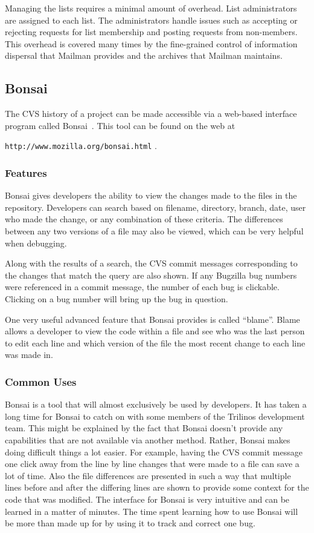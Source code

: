 \documentclass[12pt,relax]{article}
\newcommand{\InlineDirectory}[1]{
  {\hspace{0.01 in}} {\tt #1} {\hspace{0.01 in}}}
\begin{document}
Managing the lists requires a minimal amount of overhead.  List administrators
are assigned to each list.  The administrators handle issues such as accepting
or rejecting requests for list membership and posting requests from 
non-members.  This overhead is covered many times by the fine-grained control
of information dispersal that Mailman provides and the archives that 
Mailman maintains.

\subsection{Bonsai}
\label{subsect:Bonsai}

The CVS history of a project can be made accessible via a
web-based interface program called Bonsai~\cite{Bonsai}.  This tool can be 
found on the web at 
\newline
\InlineDirectory{http://www.mozilla.org/bonsai.html}.  

\subsubsection{Features}

Bonsai gives developers the ability to view the changes made to the files in 
the repository. Developers can search 
based on filename, directory, branch, date, user who made the 
change, or any combination of these criteria.  The differences between any two 
versions of a file may also be viewed, which can be very helpful when 
debugging.  

Along with the results of a search, the CVS commit messages corresponding to 
the changes that match the query are also shown.  If any Bugzilla bug numbers 
were referenced in a commit message, the number of each bug is clickable.  
Clicking on a bug number will bring up the bug in question.

One very useful advanced feature that Bonsai provides is called ``blame''.  
Blame allows a developer to view the code within a file and see who was the 
last person to edit each line and which version of the file 
the most recent change to each line was made in.

\subsubsection{Common Uses}

Bonsai is a tool that will almost exclusively be used by developers.  It has 
taken a long time for Bonsai to catch on with some members of the Trilinos 
development team.  This might be explained by the fact that Bonsai doesn't 
provide any capabilities that are not available via another method.  
Rather, Bonsai makes doing difficult things a lot easier.
For example, having the CVS commit message one click away from the line 
by line changes that
were made to a file can save a lot of time.  Also the file differences are 
presented in such a way that multiple lines before and after the differing 
lines are shown to provide some context for the code that was modified.  
The interface for Bonsai is very intuitive and can be learned in a matter of 
minutes.  The time spent learning how to use Bonsai will be more than made up 
for by using it to track and correct one bug.
\end{document}
